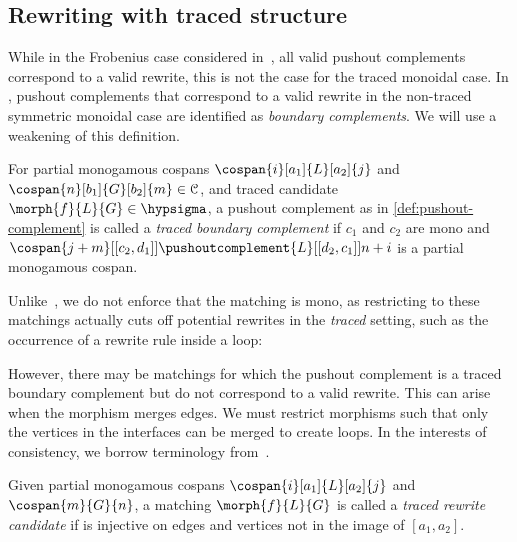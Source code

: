 \subsection{Rewriting with traced structure}

While in the Frobenius case considered in~\cite{bonchi2022string}, all valid
pushout complements correspond to a valid rewrite, this is not the case for the
traced monoidal case.
In \cite{bonchi2021string}, pushout complements that correspond to a valid
rewrite in the non-traced symmetric monoidal case are identified as
\emph{boundary complements}.
We will use a weakening of this definition.

\begin{definition}
    \label{def:traced-boundary-complement}
    For partial monogamous cospans \(
        \cospan{i}[a_1]{L}[a_2]{j}
    \) and \(
        \cospan{n}[b_1]{G}[b_2]{m} \in \mathcal{C}
    \), and traced candidate \(
        \morph{f}{L}{G} \in \hypsigma
    \), a pushout complement as in \cref{def:pushout-complement} is called a
    \emph{traced boundary complement} if \(c_1\) and \(c_2\) are mono and \(
        \cospan{j+m}[[c_2,d_1]]{\pushoutcomplement{L}}[[d_2,c_1]]{{n+i}}
    \) is a partial monogamous cospan.
\end{definition}

Unlike~\cite{bonchi2021string}, we do not enforce that the matching is mono,
as restricting to these matchings actually cuts off potential rewrites in the
\emph{traced} setting, such as the occurrence of a rewrite rule inside a loop:
\begin{center}
\end{center}

However, there may be matchings for which the pushout complement is a traced
boundary complement but do not correspond to a valid rewrite.
This can arise when the morphism merges edges.
We must restrict morphisms such that only the vertices in the interfaces can be
merged to create loops.
In the interests of consistency, we borrow terminology
from~\cite{milosavljevic2022string}.

\begin{definition}
    Given partial monogamous cospans \(\cospan{i}[a_1]{L}[a_2]{j}\) and
    \(\cospan{m}{G}{n}\), a matching \(\morph{f}{L}{G}\) is called a
    \emph{traced rewrite candidate} if is injective on edges and vertices not
    in the image of \([a_1,a_2]\).
\end{definition}


